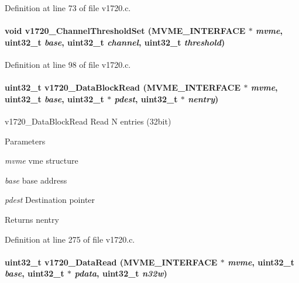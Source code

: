 Definition at line 73 of file v1720.c.
\paragraph[{v1720\_\-ChannelThresholdSet}]{\setlength{\rightskip}{0pt plus 5cm}void v1720\_\-ChannelThresholdSet ({\bf MVME\_\-INTERFACE} $\ast$ {\em mvme}, \/  uint32\_\-t {\em base}, \/  uint32\_\-t {\em channel}, \/  uint32\_\-t {\em threshold})}\hfill\label{v1720_8c_a381761572642d5968887fc4a4af210b1}


Definition at line 98 of file v1720.c.
\paragraph[{v1720\_\-DataBlockRead}]{\setlength{\rightskip}{0pt plus 5cm}uint32\_\-t v1720\_\-DataBlockRead ({\bf MVME\_\-INTERFACE} $\ast$ {\em mvme}, \/  uint32\_\-t {\em base}, \/  uint32\_\-t $\ast$ {\em pdest}, \/  uint32\_\-t $\ast$ {\em nentry})}\hfill\label{v1720_8c_acdd23caf89523068021f92e2e5fc6f07}
v1720\_\-DataBlockRead Read N entries (32bit) 
\begin{DoxyParams}{Parameters}
\item[{\em mvme}]vme structure \item[{\em base}]base address \item[{\em pdest}]Destination pointer \end{DoxyParams}
\begin{DoxyReturn}{Returns}
nentry 
\end{DoxyReturn}


Definition at line 275 of file v1720.c.
\paragraph[{v1720\_\-DataRead}]{\setlength{\rightskip}{0pt plus 5cm}uint32\_\-t v1720\_\-DataRead ({\bf MVME\_\-INTERFACE} $\ast$ {\em mvme}, \/  uint32\_\-t {\em base}, \/  uint32\_\-t $\ast$ {\em pdata}, \/  uint32\_\-t {\em n32w})}\hfill\label{v1720_8c_a5e62dbe72aa8807386b6b297ca3d342d}


